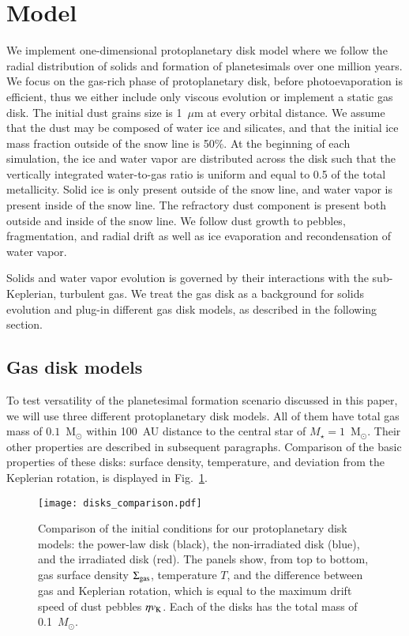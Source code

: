\documentclass{aa}
\begin{document}
\section{Model}\label{sub:models}

We implement one-dimensional protoplanetary disk model where we follow the radial distribution of solids and formation of planetesimals over one million years. We focus on the gas-rich phase of protoplanetary disk, before photoevaporation is efficient, thus we either include only viscous evolution or implement a static gas disk. The initial dust grains size is 1~$\mu$m at every orbital distance. We assume that the dust may be composed of water ice and silicates, and that the initial ice mass fraction outside of the snow line is 50\%. At the beginning of each simulation, the ice and water vapor are distributed across the disk such that the vertically integrated water-to-gas ratio is uniform and equal to 0.5 of the total metallicity. Solid ice is only present outside of the snow line, and water vapor is present inside of the snow line. The refractory dust component is present both outside and inside of the snow line. We follow dust growth to pebbles, fragmentation, and radial drift as well as ice evaporation and recondensation of water vapor.

Solids and water vapor evolution is governed by their interactions with the sub-Keplerian, turbulent gas. We treat the gas disk as a background for solids evolution and plug-in different gas disk models, as described in the following section.

\subsection{Gas disk models}

To test versatility of the planetesimal formation scenario discussed in this paper, we will use three different protoplanetary disk models. All of them have total gas mass of $0.1$~M$_{\odot}$ within 100~AU distance to the central star of $M_\star=1$~M$_{\odot}$. Their other properties are described in subsequent paragraphs. Comparison of the basic properties of these disks: surface density, temperature, and deviation from the Keplerian rotation, is displayed in Fig.~\ref{fig:disks}.

\begin{figure}
   \centering
   \texttt{[image: disks\_comparison.pdf]}
      \caption{Comparison of the initial conditions for our protoplanetary disk models: the power-law disk (black), the non-irradiated disk (blue), and the irradiated disk (red). The panels show, from top to bottom, gas surface density $\Sigma_{\rm gas}$, temperature $T$, and the difference between gas and Keplerian rotation, which is equal to the maximum drift speed of dust pebbles $\eta v_{\rm K}$. Each of the disks has the total mass of 0.1~$M_{\odot}$. }
      \label{fig:disks}
\end{figure}
\end{document}
